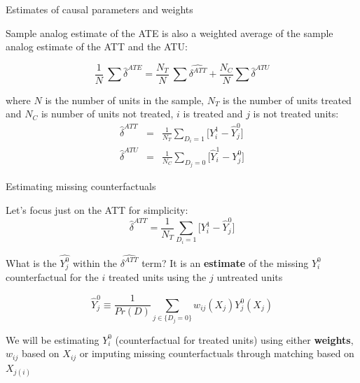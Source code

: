 \documentclass{beamer}
\begin{document}
\begin{frame}{Estimates of causal parameters and weights}

Sample analog estimate of the ATE is also a weighted average of the sample analog estimate of the ATT and the ATU:

$$\frac{1}{N}\ \sum \widehat{\delta}^{ATE} = \frac{N_T}{N}\ \sum \widehat{\delta^{ATT}} + \frac{N_C}{N} \sum \widehat{\delta}^{ATU}$$


where $N$ is the number of units in the sample, $N_T$ is the number of units treated and $N_C$ is number of units not treated, $i$ is treated and $j$ is not treated units:
\begin{eqnarray*}
\widehat{\delta}^{ATT} &=& \frac{1}{N_T} \sum_{D_i=1} \bigg [Y_i^1 - \widehat{Y}_{j}^0 \bigg ] \\
\widehat{\delta}^{ATU} &=& \frac{1}{N_C} \sum_{D_j=0} \bigg [\widehat{Y}_i^1 - Y_j^0 \bigg ]
\end{eqnarray*}


\end{frame}


\begin{frame}{Estimating missing counterfactuals}

Let's focus just on the ATT for simplicity: $$\widehat{\delta}^{ATT} = \frac{1}{N_T} \sum_{D_i=1} \bigg [Y_i^1 - \widehat{Y}_{j}^0 \bigg ] $$

What is the $\widehat{Y^0_j}$ within the $\widehat{\delta^{ATT}}$ term?  It is an \textbf{estimate} of the missing $Y^0_i$ counterfactual for the $i$ treated units using the $j$ untreated units

\bigskip

$$\widehat{Y}^0_j \equiv \frac{1}{Pr(D)} \sum_{j \in \{D_j=0\}}w_{ij}(X_j) Y_j^0(X_j)$$

\bigskip
We will be estimating $Y^0_i$ (counterfactual for treated units) using either \textbf{weights}, $w_{ij}$ based on $X_{ij}$ or imputing missing counterfactuals through matching based on $X_{j(i)}$


\end{frame}
\end{document}

